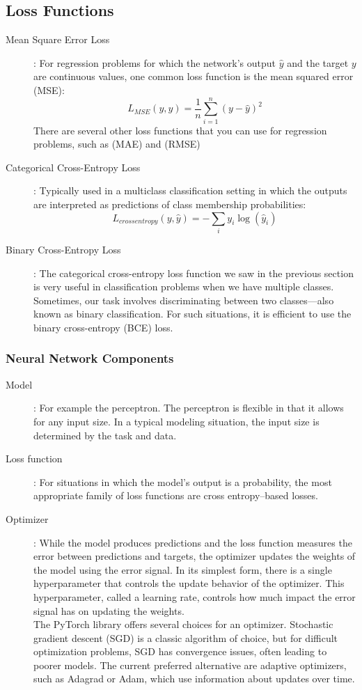 \documentclass[french]{article}
\begin{document}
\subsection{Loss Functions}

\begin{description}
    \item[Mean Square Error Loss]: For regression problems for which the network’s output $\hat y$ and the target $y$ are continuous values, one common loss function is the mean squared error (MSE):
        \[L_{MSE}(y, \hat y)= \frac{1}{n}\sum_{i=1}^n(y - \hat y)^2\]
        There are several other loss functions that you can use for regression problems, such as (MAE) and (RMSE)
    \item[Categorical Cross-Entropy Loss]: Typically used in a multiclass classification setting in which the outputs are interpreted as predictions of class membership probabilities:
        \[L_{cross entropy}(y, \hat y) = -\sum_i y_i \log(\hat y_i)\]
    \item[Binary Cross-Entropy Loss]: The categorical cross-entropy loss function we saw in the previous section is very useful in classification problems when we have multiple classes. Sometimes, our task involves discriminating between two classes—also known as binary classification. For such situations, it is efficient to use the binary cross-entropy (BCE) loss.
\end{description}

\subsubsection{Neural Network Components}

\begin{description}
    \item[Model]: For example the perceptron. The perceptron is flexible in that it allows for any input size. In a typical modeling situation, the input size is determined by the task and data.
    \item[Loss function]: For situations in which the model’s output is a probability, the most appropriate family of loss functions are cross entropy–based losses.
    \item[Optimizer]: While the model produces predictions and the loss function measures the error between predictions and targets, the optimizer updates the weights of the model using the error signal. In its simplest form, there is a single hyperparameter that controls the update behavior of the optimizer. This hyperparameter, called a learning rate, controls how much impact the error signal has on updating the weights.\\

    The PyTorch library offers several choices for an optimizer. Stochastic gradient descent (SGD) is a classic algorithm of choice, but for difficult optimization problems, SGD has convergence issues, often leading to poorer models. The current preferred alternative are adaptive optimizers, such as Adagrad or Adam, which use information about updates over time.
\end{description}
\end{document}
